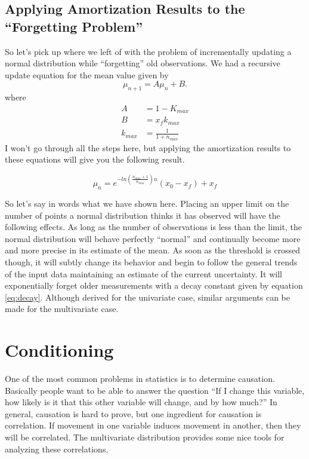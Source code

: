 \documentclass[../../main.tex]{subfiles}
\begin{document}
\subsection{Applying Amortization Results to the ``Forgetting Problem''}
So let's pick up where we left of with the problem of incrementally updating a
normal distribution while ``forgetting'' old observations.  We had a recursive
update equation for the mean value given by
\begin{equation}
    \mu_{n+1} = A \mu_n + B. \nonumber
\end{equation}
where
\begin{align}
    A &= 1 - K_{max} \nonumber\\
    B &= x_f k_{max} \nonumber\\
    k_{max} &= \frac{1}{1+n_{max}}
\end{align}
I won't go through all the steps here, but applying the amortization results
to these equations will give you the following result.

\begin{equation}
    \label{eq:expsolution}
    \mu_n = e^{-ln \left( \frac{n_{max} + 1}{n_{max}}  \right) n}
          \left( x_0 - x_f \right) + x_f
\end{equation}

So let's say in words what we have shown here.  Placing an upper limit on the
number of points a normal distribution thinks it has observed will have the
following effects.  As long as the number of observations is less than the
limit, the normal distribution will behave perfectly ``normal'' and
continually become more and more precise in its estimate of the mean.  As soon
as the threshold is crossed though, it will subtly change its behavior and
begin to follow the general trends of the input data maintaining an estimate
of the current uncertainty.  It will exponentially forget older measurements
with a decay constant given by equation \eqref{eq:decay}. Although derived for
the univariate case, similar arguments can be made for the multivariate case.
 
\section{Conditioning}
One of the most common problems in statistics is to determine causation.
Basically people want to be able to answer the question ``If I change this
variable, how likely is it that this other variable will change, and by how
much?''  In general, causation is hard to prove, but one ingredient for
causation is correlation.  If movement in one variable induces movement in
another, then they will be correlated.  The multivariate distribution provides
some nice tools for analyzing these correlations.
\end{document}
